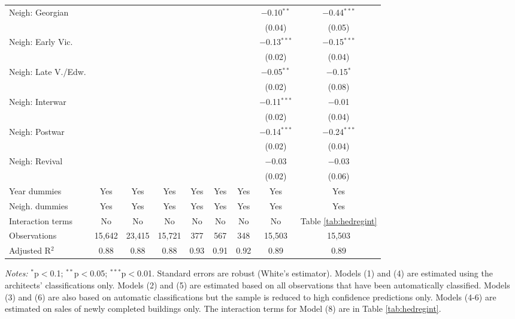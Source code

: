 \documentclass[]{article}
\begin{document}
\begin{table}[!htbp]
\begin{tabular}{@{\extracolsep{5pt}}lcccccccc}
   Neigh: Georgian &  &  &  &  &  &  & $-$0.10$^{**}$ & $-$0.44$^{***}$ \\ 
  &  &  &  &  &  &  & (0.04) & (0.05) \\ 
  Neigh: Early Vic. &  &  &  &  &  &  & $-$0.13$^{***}$ & $-$0.15$^{***}$ \\ 
  &  &  &  &  &  &  & (0.02) & (0.04) \\ 
  Neigh: Late V./Edw. &  &  &  &  &  &  & $-$0.05$^{**}$ & $-$0.15$^{*}$ \\ 
  &  &  &  &  &  &  & (0.02) & (0.08) \\ 
  Neigh: Interwar &  &  &  &  &  &  & $-$0.11$^{***}$ & $-$0.01 \\ 
  &  &  &  &  &  &  & (0.02) & (0.04) \\ 
  Neigh: Postwar &  &  &  &  &  &  & $-$0.14$^{***}$ & $-$0.24$^{***}$ \\ 
  &  &  &  &  &  &  & (0.02) & (0.04) \\ 
  Neigh: Revival &  &  &  &  &  &  & $-$0.03 & $-$0.03 \\ 
  &  &  &  &  &  &  & (0.02) & (0.06) \\  
\midrule
Year dummies & Yes & Yes & Yes & Yes & Yes & Yes & Yes & Yes \\ 
Neigh. dummies & Yes & Yes & Yes & Yes & Yes & Yes & Yes & Yes \\ 
Interaction terms & No & No & No & No & No & No & No & Table \ref{tab:hedregint} \\ 
Observations & 15,642 & 23,415 & 15,721 & 377 & 567 & 348 & 15,503 & 15,503 \\ 
Adjusted R$^{2}$ & 0.88 & 0.88 & 0.88 & 0.93 & 0.91 & 0.92 & 0.89 & 0.89 \\ 
\bottomrule
\end{tabular} 
\begin{minipage}{\textwidth}
\vspace{0.25cm}
\footnotesize \emph{Notes:} $^{*}$p$<$0.1; $^{**}$p$<$0.05; $^{***}$p$<$0.01. Standard errors are robust (White's estimator). Models (1) and (4) are estimated using the architects' classifications only. Models (2) and (5) are estimated based on all observations that have been automatically classified. Models (3) and (6) are also based on automatic classifications but the sample is reduced to high confidence predictions only. Models (4-6) are estimated on sales of newly completed buildings only. The interaction terms for Model (8) are in Table \ref{tab:hedregint}.  
\end{minipage}
\end{table}
\end{document}
